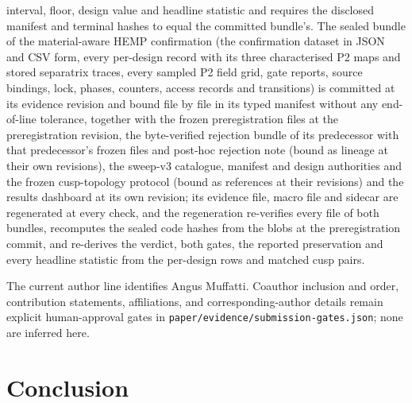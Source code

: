 \documentclass[11pt]{article}
\begin{document}
interval, floor, design value and headline statistic and requires the disclosed
manifest and terminal hashes to equal the committed bundle's. The sealed bundle of
the material-aware HEMP confirmation (the confirmation dataset in JSON and CSV form,
every per-design record with its three characterised P2 maps and stored separatrix
traces, every sampled P2 field grid, gate reports, source bindings, lock, phases,
counters, access records and transitions) is committed at its evidence revision and
bound file by file in its typed manifest without any end-of-line tolerance,
together with the frozen preregistration files at the preregistration revision,
the byte-verified rejection bundle of its predecessor with that predecessor's
frozen files and post-hoc rejection note (bound as lineage at their own
revisions), the sweep-v3 catalogue, manifest and design authorities and the frozen
cusp-topology protocol (bound as references at their revisions) and the results
dashboard at its own revision; its evidence file, macro file and sidecar are
regenerated at every check, and the regeneration re-verifies every file of both
bundles, recomputes the sealed code hashes from the blobs at the preregistration
commit, and re-derives the verdict, both gates, the reported preservation and every
headline statistic from the per-design rows and matched cusp pairs.

The current author line identifies Angus Muffatti. Coauthor inclusion and order,
contribution statements, affiliations, and corresponding-author details remain
explicit human-approval gates in
\texttt{paper/evidence/submission-gates.json}; none are inferred here.

\section{Conclusion}
\end{document}
